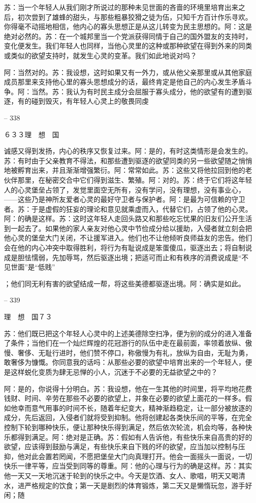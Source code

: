 \documentclass[11pt,oneside]{book}
\begin{document}
\begin{common-format}
    苏：当一个年轻人从我们刚才所说过的那种未见世面的吝啬的环境里培育出来之后，初次尝到了雄蜂的甜头，与那些粗暴狡猾之徒为伍，只知千方百计作乐寻欢。你得毫不动摇地相信，他内心的寡头思想正是从这儿转变为民主思想的。阿：这是绝对必然的。苏：在一个城邦里当一个党派获得同情于自己的国外盟友的支持时，变化便发生。我们年轻人也同样，当他心灵里的这种或那种欲望在得到外来的同类或类似的欲望支持时，就发生心灵的变革。我们如此地说对吗？

    阿：当然对的。苏：我设想，这时如果又有一外力，或从他父亲那里或从其他家庭成员那里来支持他心里的寡头思想成分的话，最终肯定是他自己的内心发生矛盾斗争。阿：当然。苏：我认为有时民主成分会屈服于寡头成分，他的欲望有的遭到驱逐，有的碰到毁灭，有年轻人心灵上的敬畏同虔

    

-- 338

    ６３３理　想　国

    诚感又得到发扬，内心的秩序又恢复过来。阿：是的，有时这类情形是会发生的。苏：有时由于父亲教育不得法，和那些遭到驱逐的欲望同类的另一些欲望随之悄悄地被孵育出来，并且渐渐增强繁衍。阿：常常如此。苏：这些又将他拉回到他的老伙伴那里，在秘密交合中它们得到滋生、繁殖。阿：对的。苏：终于它们将这年轻人的心灵堡垒占领了，发觉里面空无所有，没有学问，没有理想，没有事业心，——这些乃是神所友爱者心灵的最好守卫者与保护者。阿：是最为可信赖的守卫者。苏：于是虚假的狂妄的理论和意见就乘虚而入，代替它们，占领了他的心灵。阿：的确是这样。苏：这时这年轻人走回头路又和那些吃忘忧果的旧友们公开生活到一起去了。如果他的家人亲友对他心灵中节俭成分给以援助，入侵者就立刻会把他心灵的堡垒大门关闭，不让援军进入。他们也不让他倾听良师益友的忠告。他们会在他的内心冲突中取得胜利，将行为有耻说成是笨蛋傻瓜，驱逐出去；将自制说成是胆怯懦弱，先加辱骂，然后驱逐出境；把适可而止和有秩序的消费说成是“不见世面”是“低贱”

    ；他们同无利有害的欲望结成一帮，将这些美德都驱逐出境。阿：确实是如此。

    

-- 339

    理　想　国７３

    苏：他们既已把这个年轻人心灵中的上述美德除空扫净，便为别的成分的进入准备了条件；当他们在一个灿烂辉煌的花冠游行的队伍中走在最前面，率领着放纵、傲慢、奢侈、无耻行进时，他们赞不停口，称傲慢为有礼，放纵为自由，无耻为勇，敢奢侈为慷慨。你同意我的话吗：从那些必要的欲望中培育出来的一个年轻人，便是这样蜕化变质为肆无忌惮的小人，沉迷于不必要的无益欲望之中的？

    阿：是的，你说得十分明白。苏：我设想，他在一生其他的时间里，将平均地花费钱财、时间、辛劳在那些不必要的欲望上，并象在必要的欲望上面花的一样多。假如他幸而意气用事的时间不长，随着年纪变大，精神渐趋稳定，让一部分被放逐的成分，先后返回，入侵者们就将受到抑制。他将创建起各类快乐间的平等，在完全控制下轮到哪种快乐，便让那种快乐得到满足，然后依次轮流，机会均等，各种快乐都得到满足。阿：绝对是正确。苏：假如有人告诉他，有些快乐来自高贵的好的欲望，应该得到鼓励与满足，有些快乐来自下贱的坏的欲望，应当加以控制与压抑，他对此会置若罔闻，不愿把堡垒大门向真理打开。他会一面摇头一面说，一切快乐一律平等，应当受到同等的尊重。阿：他的心理与行为的确是这样。苏：其实他一天又一天地沉迷于轮到的快乐之中。今天是饮酒、女人、歌唱，明天又喝清水，进严格规定的饮食；第一天是剧烈的体育锻炼，第二天又是懒惰玩忽，游手好闲；随


\end{common-format}
\end{document}
